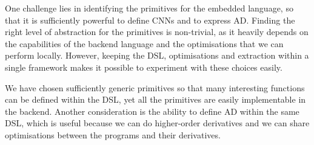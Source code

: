 One challenge lies in identifying the primitives for the embedded language,
so that it is sufficiently powerful to define CNNs and to express AD.
Finding the right level of abstraction for the primitives is non-trivial,
as it heavily depends on the capabilities of the backend language and the
optimisations that we can perform locally.  However, keeping the DSL,
optimisations and extraction within a single framework makes it possible
to experiment with these choices easily.


We have chosen sufficiently generic primitives so that many interesting
functions can be defined within the DSL, yet all the primitives are easily
implementable in the backend.  Another consideration is the ability to define
AD within the same DSL, which is useful because we can do higher-order
derivatives and we can share optimisations between the programs and their
derivatives.
\begin{code}[hide]%
\>[0]\AgdaSpace{}%
\AgdaSpace{}%
\<%
\\
\>[0][@{}l@{\AgdaIndent{0}}]%
\>[2]\<%
\\
%
\>[2]\AgdaSpace{}%
\AgdaSpace{}%
\AgdaSpace{}%
\AgdaSpace{}%
\AgdaSymbol{(}\AgdaSymbol{;}\AgdaSpace{}%
\AgdaSymbol{;}\AgdaSpace{}%
\AgdaSymbol{)}\<%
\\
%
\>[2]\AgdaSpace{}%
\AgdaSpace{}%
\<%
\\
%
\>[2]\AgdaSpace{}%
\AgdaSpace{}%
\<%
\\
\>[2][@{}l@{\AgdaIndent{0}}]%
\>[4]\AgdaSpace{}%
\AgdaSpace{}%
\<%
\\
%
\>[4]\AgdaSpace{}%
\AgdaSpace{}%
\<%
\\
%
\\[\AgdaEmptyExtraSkip]%
%
\>[2]\AgdaSpace{}%
\AgdaSpace{}%
\AgdaSpace{}%
\AgdaSymbol{(}\AgdaSymbol{;}\AgdaSpace{}%
\AgdaSymbol{;}\AgdaSpace{}%
\AgdaSymbol{;}\AgdaSpace{}%
\AgdaSymbol{;}\AgdaSpace{}%
\AgdaSymbol{;}\AgdaSpace{}%
\AgdaSymbol{)}\<%
\\
\>[0]\<%
\end{code}

